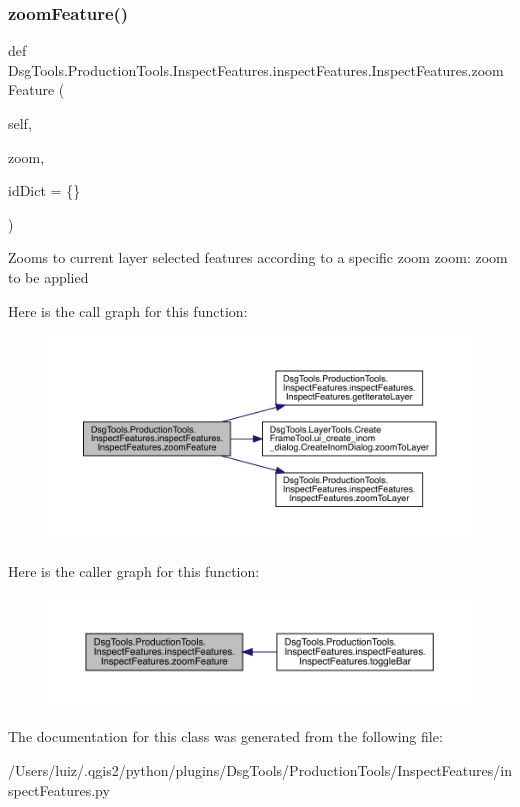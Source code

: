 \subsubsection{\texorpdfstring{zoom\+Feature()}{zoomFeature()}}
{\footnotesize\ttfamily def Dsg\+Tools.\+Production\+Tools.\+Inspect\+Features.\+inspect\+Features.\+Inspect\+Features.\+zoom\+Feature (\begin{DoxyParamCaption}\item[{}]{self,  }\item[{}]{zoom,  }\item[{}]{id\+Dict = {\ttfamily \{\}} }\end{DoxyParamCaption})}

\begin{DoxyVerb}Zooms to current layer selected features according to a specific zoom
zoom: zoom to be applied
\end{DoxyVerb}
 Here is the call graph for this function\+:
\nopagebreak
\begin{figure}[H]
\begin{center}
\leavevmode
\includegraphics[width=350pt]{class_dsg_tools_1_1_production_tools_1_1_inspect_features_1_1inspect_features_1_1_inspect_features_a6355cf445d22094188709bcdebdccddc_cgraph}
\end{center}
\end{figure}
Here is the caller graph for this function\+:
\nopagebreak
\begin{figure}[H]
\begin{center}
\leavevmode
\includegraphics[width=350pt]{class_dsg_tools_1_1_production_tools_1_1_inspect_features_1_1inspect_features_1_1_inspect_features_a6355cf445d22094188709bcdebdccddc_icgraph}
\end{center}
\end{figure}


The documentation for this class was generated from the following file\+:\begin{DoxyCompactItemize}
\item 
/\+Users/luiz/.\+qgis2/python/plugins/\+Dsg\+Tools/\+Production\+Tools/\+Inspect\+Features/inspect\+Features.\+py\end{DoxyCompactItemize}
